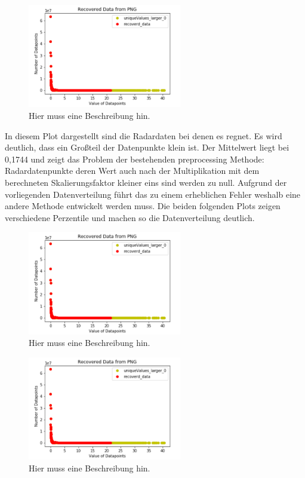 \begin{figure}[h]
 \centering
 \includegraphics[width=0.6\textwidth,angle=0]{abb/datenaufbereitung_beispiel}
 \caption[Datenaufbereitung]{Hier muss eine Beschreibung hin.}
\label{fig:datenaufbereitung}
\end{figure}

In diesem Plot dargestellt sind die Radardaten bei denen es regnet. Es wird deutlich, dass ein Großteil der Datenpunkte klein ist. Der Mittelwert liegt bei 0,1744 und zeigt das Problem der bestehenden preprocessing Methode: Radardatenpunkte deren Wert auch nach der Multiplikation mit dem berechneten Skalierungsfaktor kleiner eins sind werden zu null. Aufgrund der vorliegenden Datenverteilung führt das zu einem erheblichen Fehler weshalb eine andere Methode entwickelt werden muss.   
Die beiden folgenden Plots zeigen verschiedene Perzentile und machen so die Datenverteilung deutlich.  

\begin{figure}[h]
 \centering
 \includegraphics[width=0.6\textwidth,angle=0]{abb/datenaufbereitung_beispiel}
 \caption[Datenaufbereitung]{Hier muss eine Beschreibung hin.}
\label{fig:datenaufbereitung}
\end{figure}

\begin{figure}[h]
 \centering
 \includegraphics[width=0.6\textwidth,angle=0]{abb/datenaufbereitung_beispiel}
 \caption[Datenaufbereitung]{Hier muss eine Beschreibung hin.}
\label{fig:datenaufbereitung}
\end{figure}

